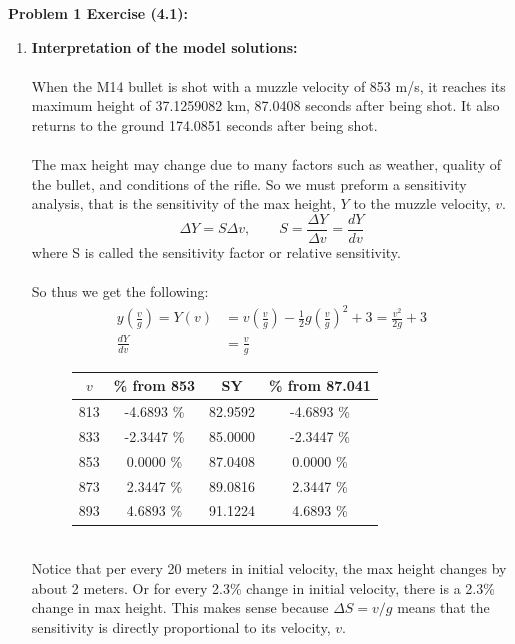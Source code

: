 \documentclass[11pt]{article}
\newenvironment{problem}[1]{\textbf{Problem #1: }}{\newpage}
\newenvironment{Shaded}{\begin{snugshade}}{\end{snugshade}}
\begin{document}
\begin{problem}{1 Exercise (4.1)}
\begin{enumerate}[label = \textbf{Step \arabic*.}]
			\newpage
			\item \textbf{Interpretation of the model solutions:}
			\\ \\
			When the M14 bullet is shot with a muzzle velocity of 853 m/s, it reaches its maximum height of 37.1259082 km, 87.0408 seconds after being shot.  It also returns to the ground 174.0851 seconds after being shot. 
			\\ \\
			The max height may change due to many factors such as weather, quality of the bullet, and conditions of the rifle.  So we must preform a sensitivity analysis, that is the sensitivity of the max height, $Y$ to the muzzle velocity, $v$.
			\[\Delta Y = S\Delta v, \qquad S = \frac{\Delta Y}{\Delta v} = \frac{dY}{dv}\]
			where S is called the sensitivity factor or relative sensitivity.
			\\ \\
			So thus we get the following:
			\begin{align*}
				y\left(\frac{v}{g}\right) = Y(v) &= v\left(\frac{v}{g}\right) - \frac{1}{2}g\left(\frac{v}{g}\right)^2 + 3 = \frac{v^2}{2g} + 3 \\
				\frac{dY}{dv} &= \frac{v}{g}
			\end{align*}
			\begin{figure}[h!]
				\centering
				\begin{tabular}{|c|c|c|c|}
					\hline
					$v$ & \% from 853 & SY & \% from 87.041 \\
					\hline
					813 & -4.6893 \%  & 82.9592 & -4.6893 \% \\  
					833 & -2.3447 \%  & 85.0000 & -2.3447 \% \\
					853 & 0.0000  \%  & 87.0408 & 0.0000  \%\\
					873 & 2.3447 \%   & 89.0816 & 2.3447 \% \\
					893 & 4.6893 \%   & 91.1224 & 4.6893 \% \\
					\hline
				\end{tabular}
			\end{figure}  
			\\ 
			Notice that per every 20 meters in initial velocity, the max height changes by about 2 meters. Or for every 2.3\% change in initial velocity, there is a 2.3\% change in max height.  This makes sense because $\Delta S = v / g$ means that the sensitivity is directly proportional to its velocity, $v$.
			\newpage
\begin{Shaded}
\begin{Highlighting}[]

\end{Highlighting}
\end{Shaded}
\end{enumerate}
\end{problem}
\end{document}
